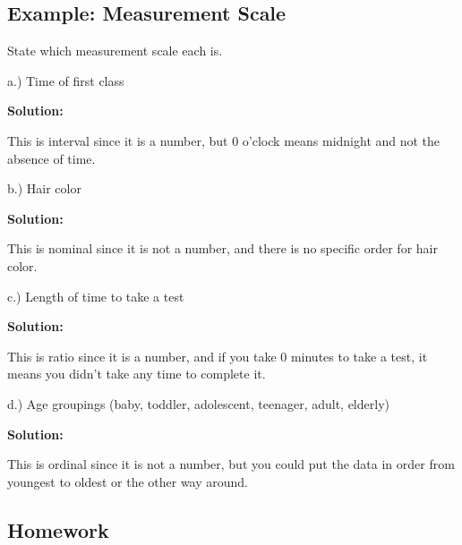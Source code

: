 \documentclass[]{book}
\begin{document}
\hypertarget{example-measurement-scale}{%
\subsection{Example: Measurement Scale}\label{example-measurement-scale}}

State which measurement scale each is.

a.) Time of first class

\textbf{Solution:}

This is interval since it is a number, but 0 o'clock means midnight and not the absence of time.

b.) Hair color

\textbf{Solution:}

This is nominal since it is not a number, and there is no specific order for hair color.

c.) Length of time to take a test

\textbf{Solution:}

This is ratio since it is a number, and if you take 0 minutes to take a test, it means you didn't take any time to complete it.

d.) Age groupings (baby, toddler, adolescent, teenager, adult, elderly)

\textbf{Solution:}

This is ordinal since it is not a number, but you could put the data in order from youngest to oldest or the other way around.

\hypertarget{homework}{%
\subsection{Homework}\label{homework}}
\end{document}
